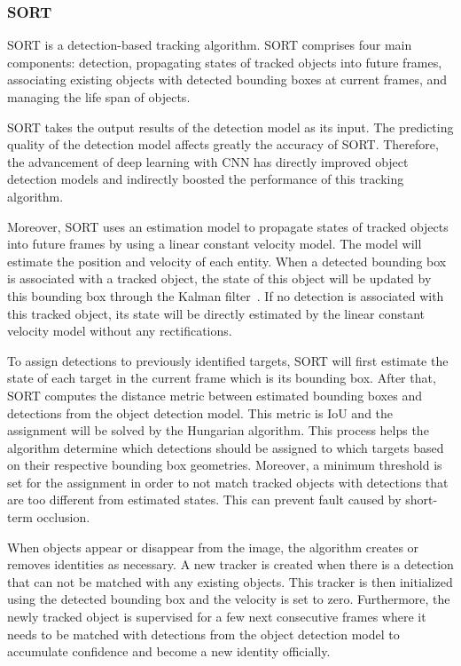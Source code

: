 \documentclass[../main.tex]{subfiles}
\begin{document}
\subsubsection{SORT}
\label{subsec:sort}
SORT is a detection-based tracking algorithm. SORT comprises four main components: detection, propagating states of tracked objects into future frames, associating existing objects with detected bounding boxes at current frames, and managing the life span of objects.

SORT takes the output results of the detection model as its input. The predicting quality of the detection model affects greatly the accuracy of SORT. Therefore, the advancement of deep learning with CNN has directly improved object detection models and indirectly boosted the performance of this tracking algorithm.

Moreover, SORT uses an estimation model to propagate states of tracked objects into future frames by using a linear constant velocity model. The model will estimate the position and velocity of each entity. When a detected bounding box is associated with a tracked object, the state of this object will be updated by this bounding box through the Kalman filter~\cite{kalman}. If no detection is associated with this tracked object, its state will be directly estimated by the linear constant velocity model without any rectifications.

To assign detections to previously identified targets, SORT will first estimate the state of each target in the current frame which is its bounding box. After that, SORT computes the distance metric between estimated bounding boxes and detections from the object detection model. This metric is IoU and the assignment will be solved by the Hungarian algorithm. This process helps the algorithm determine which detections should be assigned to which targets based on their respective bounding box geometries. Moreover, a minimum threshold is set for the assignment in order to not match tracked objects with detections that are too different from estimated states. This can prevent fault caused by short-term occlusion.

When objects appear or disappear from the image, the algorithm creates or removes identities as necessary. A new tracker is created when there is a detection that can not be matched with any existing objects. This tracker is then initialized using the detected bounding box and the velocity is set to zero. Furthermore, the newly tracked object is supervised for a few next consecutive frames where it needs to be matched with detections from the object detection model to accumulate confidence and become a new identity officially.
\end{document}
